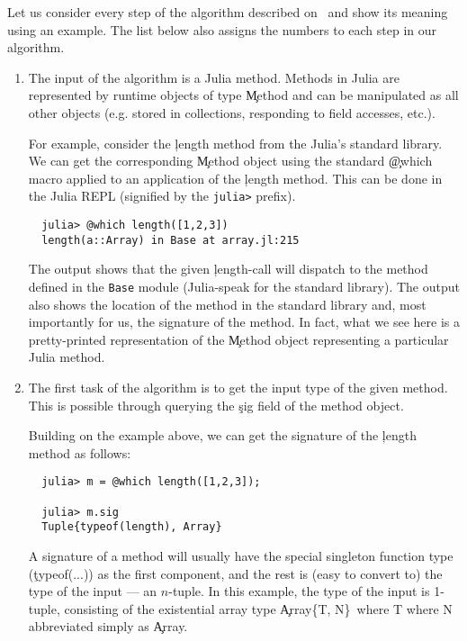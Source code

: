 \documentclass[sigplan,review,anonymous]{acmart}
\begin{document}
Let us consider every step of the algorithm described
on~ and show its meaning using an example.
The list below also assigns the numbers to each step in our algorithm.
\begin{enumerate}

  \item The input of the algorithm is a Julia method. Methods in Julia are
  represented by runtime objects of type \c{Method} and can be manipulated as
  all other objects (e.g. stored in collections, responding to field accesses, etc.).

  For example, consider the \c{length} method from the Julia's standard library. We can
  get the corresponding \c{Method} object using the standard \c{@which} macro
  applied to an application of the \c{length} method. This can be done in the
  Julia REPL (signified by the \texttt{julia>} prefix).
\begin{verbatim}
  julia> @which length([1,2,3])
  length(a::Array) in Base at array.jl:215
\end{verbatim}

  The output shows that the given \c{length}-call will dispatch to the
  method defined in the \texttt{Base} module (Julia-speak for the standard
  library). The output also shows the location of the method in the
  standard library and, most importantly for us, the signature of the
  method. In fact, what we see here is a pretty-printed representation of
  the \c{Method} object representing a particular Julia method.

  \item The first task of the algorithm is to get the input type of the given
  method. This is possible through querying the \c{sig} field of the method object.

  Building on the example above, we can get the signature of the \c{length}
  method as follows:
\begin{verbatim}
  julia> m = @which length([1,2,3]);

  julia> m.sig
  Tuple{typeof(length), Array}
\end{verbatim}

  A signature of a method will usually have the special singleton function
  type (\c{typeof(...)}) as the first component, and the rest is (easy to
  convert to) the type of the input --- an $n$-tuple. In this example, the type of
  the input is 1-tuple, consisting of the existential array type
  \c{Array\{T, N\}\ where T where N} abbreviated simply as \c{Array}.


\end{enumerate}
\end{document}

